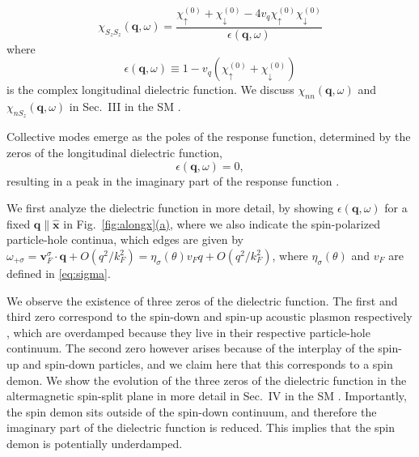 \documentclass[aps,prl,reprint,twocolumns,superscriptaddress]{revtex4-2}
\DeclareMathOperator{\Imm}{Im}
\newcommand{\xx}{\hat{\bm{x}}}
\newcommand{\kF}{k_{F}}
\newcommand{\subfigref}[2]{Fig.~\hyperref[#1]{\ref*{#1}#2}}
\begin{document}
	\begin{equation}
		\chi_{S_zS_z}(\bm q,\omega)=\frac{\chi_\uparrow^{(0)}+\chi_\downarrow^{(0)}-4v_q\chi_\uparrow^{(0)}\chi_\downarrow^{(0)}}{\epsilon(\bm q,\omega)}
	\end{equation}
	where 
	\begin{equation}
		\epsilon(\bm q,\omega) \equiv 1 - v_q \left(\chi_\uparrow^{(0)}+\chi_\downarrow^{(0)}\right)
	\end{equation}
	is the complex longitudinal dielectric function. We discuss $\chi_{nn}(\bm q,\omega)$ and $\chi_{nS_z}(\bm q,\omega)$ in Sec.~III in the SM \cite{Note1}. 
	
	Collective modes emerge as the poles of the response function, determined by the zeros of the longitudinal dielectric function, 
	\begin{equation}
		\epsilon(\bm q,\omega) = 0, \label{eq:poles}
	\end{equation}
	resulting in a peak in the imaginary part of the response function \cite{giulianiQuantumTheoryElectron2005}. 
	
	
	
	We first analyze the dielectric function in more detail, by showing $\epsilon(\bm q,\omega)$ for a fixed $\bm q\parallel \xx$ in \subfigref{fig:alongx}{(a)}, where we also indicate the spin-polarized particle-hole continua, which edges are given by $\omega_{+\sigma}=\bm v_F^\sigma\cdot \bm q + O(q^2/\kF^2)=\eta_\sigma(\theta) v_F q+ O(q^2/\kF^2)$, where $\eta_\sigma(\theta)$ and $v_F$ are defined in \cref{eq:sigma}.
	
	We observe the existence of three zeros of the dielectric function. The first and third zero correspond to the spin-down and spin-up acoustic plasmon respectively \cite{kamenevFieldTheoryNonEquilibrium2023,kaltenbornPlasmonDispersionsSimple2013}, which are overdamped because they live in their respective particle-hole continuum. The second zero however arises because of the interplay of the spin-up and spin-down particles, and we claim here that this corresponds to a spin demon. We show the evolution of the three zeros of the dielectric function in the altermagnetic spin-split plane in more detail in Sec.~IV in the SM \cite{Note1}.
	Importantly, the spin demon sits outside of the spin-down continuum, and therefore the imaginary part of the dielectric function is reduced. This implies that the spin demon is potentially underdamped.
	
\end{document}
